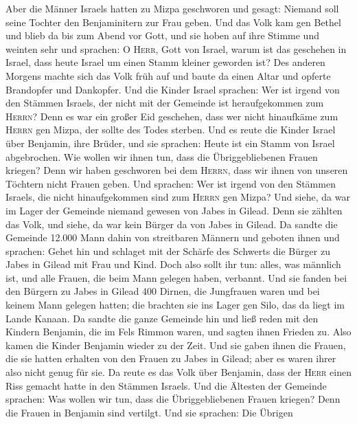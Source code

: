  Aber die Männer Israels hatten zu Mizpa geschworen und
gesagt: Niemand soll seine Tochter den Benjaminitern zur Frau geben.
 Und das Volk kam gen Bethel und blieb da bis zum Abend
vor Gott, und sie hoben auf ihre Stimme und weinten sehr 
und sprachen: O \textsc{Herr}, Gott von Israel, warum ist das geschehen
in Israel, dass heute Israel um einen Stamm kleiner geworden ist?
 Des anderen Morgens machte sich das Volk früh auf und
baute da einen Altar und opferte Brandopfer und Dankopfer.
 Und die Kinder Israel sprachen: Wer ist irgend von den
Stämmen Israels, der nicht mit der Gemeinde ist heraufgekommen zum
\textsc{Herrn}? Denn es war ein großer Eid geschehen, dass wer nicht
hinaufkäme zum \textsc{Herrn} gen Mizpa, der sollte des Todes sterben.
 Und es reute die Kinder Israel über Benjamin, ihre
Brüder, und sie sprachen: Heute ist ein Stamm von Israel abgebrochen.
 Wie wollen wir ihnen tun, dass die Übriggebliebenen
Frauen kriegen? Denn wir haben geschworen bei dem \textsc{Herrn}, dass
wir ihnen von unseren Töchtern nicht Frauen geben.  Und
sprachen: Wer ist irgend von den Stämmen Israels, die nicht
hinaufgekommen sind zum \textsc{Herrn} gen Mizpa? Und siehe, da war im
Lager der Gemeinde niemand gewesen von Jabes in Gilead. 
Denn sie zählten das Volk, und siehe, da war kein Bürger da von Jabes in
Gilead.  Da sandte die Gemeinde 12.000 Mann dahin von
streitbaren Männern und geboten ihnen und sprachen: Gehet hin und
schlaget mit der Schärfe des Schwerts die Bürger zu Jabes in Gilead mit
Frau und Kind.  Doch also sollt ihr tun: alles, was
männlich ist, und alle Frauen, die beim Mann gelegen haben, verbannt.
 Und sie fanden bei den Bürgern zu Jabes in Gilead 400
Dirnen, die Jungfrauen waren und bei keinem Mann gelegen hatten; die
brachten sie ins Lager gen Silo, das da liegt im Lande Kanaan.
 Da sandte die ganze Gemeinde hin und ließ reden mit den
Kindern Benjamin, die im Fels Rimmon waren, und sagten ihnen Frieden zu.
 Also kamen die Kinder Benjamin wieder zu der Zeit. Und
sie gaben ihnen die Frauen, die sie hatten erhalten von den Frauen zu
Jabes in Gilead; aber es waren ihrer also nicht genug für sie.
 Da reute es das Volk über Benjamin, dass der
\textsc{Herr} einen Riss gemacht hatte in den Stämmen Israels.
 Und die Ältesten der Gemeinde sprachen: Was wollen wir
tun, dass die Übriggebliebenen Frauen kriegen? Denn die Frauen in
Benjamin sind vertilgt.  Und sie sprachen: Die Übrigen
